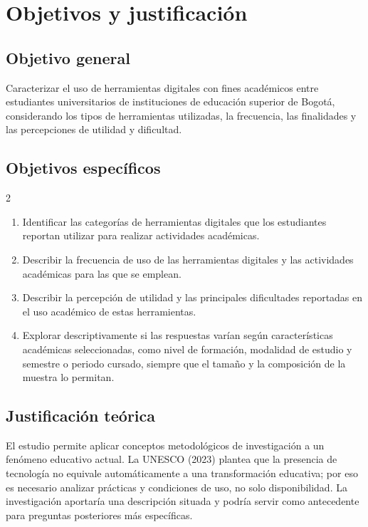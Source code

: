 \section{Objetivos y justificación}
\subsection{Objetivo general}
Caracterizar el uso de herramientas digitales con fines académicos entre estudiantes universitarios de instituciones de educación superior de Bogotá, considerando los tipos de herramientas utilizadas, la frecuencia, las finalidades y las percepciones de utilidad y dificultad.

\subsection{Objetivos específicos}
\begin{multicols}{2}
    \begin{enumerate}
        \item Identificar las categorías de herramientas digitales que los estudiantes reportan utilizar para realizar actividades académicas.
        \item Describir la frecuencia de uso de las herramientas digitales y las actividades académicas para las que se emplean.
        \vspace{1cm}
        \item Describir la percepción de utilidad y las principales dificultades reportadas en el uso académico de estas herramientas.
        \item Explorar descriptivamente si las respuestas varían según características académicas seleccionadas, como nivel de formación, modalidad de estudio y semestre o periodo cursado, siempre que el tamaño y la composición de la muestra lo permitan.
    \end{enumerate}
\end{multicols}

\subsection{Justificación teórica}
El estudio permite aplicar conceptos metodológicos de investigación a un fenómeno educativo actual. La
UNESCO (2023) plantea que la presencia de tecnología no equivale automáticamente a una transformación
educativa; por eso es necesario analizar prácticas y condiciones de uso, no solo disponibilidad. La investigación
aportaría una descripción situada y podría servir como antecedente para preguntas posteriores más específicas.

